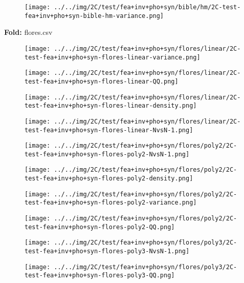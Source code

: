 \begin{figure}[H]
\centering	\texttt{[image: ../../img/2C/test/fea+inv+pho+syn/bible/hm/2C-test-fea+inv+pho+syn-bible-hm-variance.png]}
\end{figure}
\textbf{Fold:} flores.csv
\begin{figure}[H]
\centering	\texttt{[image: ../../img/2C/test/fea+inv+pho+syn/flores/linear/2C-test-fea+inv+pho+syn-flores-linear-variance.png]}
\end{figure}
\begin{figure}[H]
\centering	\texttt{[image: ../../img/2C/test/fea+inv+pho+syn/flores/linear/2C-test-fea+inv+pho+syn-flores-linear-QQ.png]}
\end{figure}
\begin{figure}[H]
\centering	\texttt{[image: ../../img/2C/test/fea+inv+pho+syn/flores/linear/2C-test-fea+inv+pho+syn-flores-linear-density.png]}
\end{figure}
\begin{figure}[H]
\centering	\texttt{[image: ../../img/2C/test/fea+inv+pho+syn/flores/linear/2C-test-fea+inv+pho+syn-flores-linear-NvsN-1.png]}
\end{figure}
\begin{figure}[H]
\centering	\texttt{[image: ../../img/2C/test/fea+inv+pho+syn/flores/poly2/2C-test-fea+inv+pho+syn-flores-poly2-NvsN-1.png]}
\end{figure}
\begin{figure}[H]
\centering	\texttt{[image: ../../img/2C/test/fea+inv+pho+syn/flores/poly2/2C-test-fea+inv+pho+syn-flores-poly2-density.png]}
\end{figure}
\begin{figure}[H]
\centering	\texttt{[image: ../../img/2C/test/fea+inv+pho+syn/flores/poly2/2C-test-fea+inv+pho+syn-flores-poly2-variance.png]}
\end{figure}
\begin{figure}[H]
\centering	\texttt{[image: ../../img/2C/test/fea+inv+pho+syn/flores/poly2/2C-test-fea+inv+pho+syn-flores-poly2-QQ.png]}
\end{figure}
\begin{figure}[H]
\centering	\texttt{[image: ../../img/2C/test/fea+inv+pho+syn/flores/poly3/2C-test-fea+inv+pho+syn-flores-poly3-NvsN-1.png]}
\end{figure}
\begin{figure}[H]
\centering	\texttt{[image: ../../img/2C/test/fea+inv+pho+syn/flores/poly3/2C-test-fea+inv+pho+syn-flores-poly3-QQ.png]}
\end{figure}
